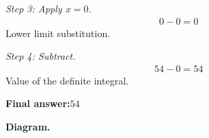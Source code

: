 \documentclass[11pt]{article}
\begin{document}
\textit{Step 3: Apply \( x = 0 \).}
\[\begin{gathered}
0 - 0 = 0
\end{gathered}\]
Lower limit substitution.

\textit{Step 4: Subtract.}
\[\begin{gathered}
54 - 0 = 54
\end{gathered}\]
Value of the definite integral.

\begin{answerbox}
\textbf{Final answer:}\quad \(\displaystyle 54\)
\end{answerbox}
\textbf{Diagram.}

\begin{center}
\end{center}
\end{document}
